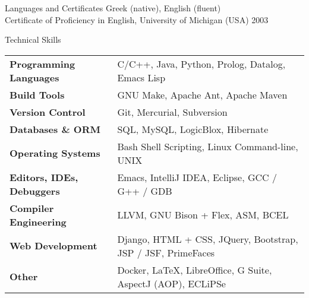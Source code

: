 \documentclass{resume}
\begin{document}
\newpage

\begin{rSection}{Languages and Certificates}
  Greek (native), English (fluent) \\
  Certificate of Proficiency in English, University of Michigan (USA)
  \hfill 2003
\end{rSection}


\begin{rSection}{Technical Skills}

{\renewcommand{\arraystretch}{1.3}
\begin{tabular}{ @{} >{\bfseries}l @{\hspace{6ex}} l }

Programming Languages
   & C/C++, Java, Python, Prolog, Datalog, Emacs Lisp \\

Build Tools
   & GNU Make, Apache Ant, Apache Maven \\

Version Control
   & Git, Mercurial, Subversion \\

Databases \& ORM
   & SQL, MySQL, LogicBlox, Hibernate \\

Operating Systems
   & Bash Shell Scripting, Linux Command-line, UNIX \\

Editors, IDEs, Debuggers
   & Emacs, IntelliJ IDEA, Eclipse, GCC / G++ / GDB \\

Compiler Engineering
   & LLVM, GNU Bison + Flex, ASM, BCEL \\


Web Development
   & Django, HTML + CSS, JQuery, Bootstrap, JSP / JSF, PrimeFaces \\

Other
   & Docker, \LaTeX{}, LibreOffice, G Suite, AspectJ (AOP), ECLiPSe \\
\end{tabular}}
\end{rSection}

\end{document}
